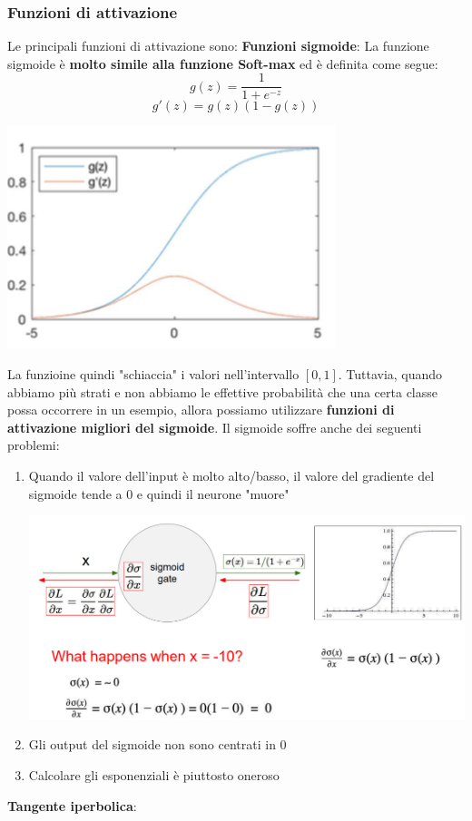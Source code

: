 \documentclass[12pt]{article}
\begin{document}
\subsubsection{Funzioni di attivazione}
Le principali funzioni di attivazione sono: \newline
\textbf{Funzioni sigmoide}: \newline 
La funzione sigmoide è \textbf{molto simile alla funzione Soft-max} ed è definita come segue:
$$g(z) = \frac{1}{1 + e^{-z}}$$
$$g'(z) = g(z)(1-g(z))$$
\begin{center}
    \includegraphics[width =0.40\linewidth]{Images/131.PNG}
\end{center}
La funzioine quindi "schiaccia" i valori nell'intervallo $[0,1]$. Tuttavia, quando abbiamo più strati e non abbiamo le effettive probabilità che una certa classe possa occorrere in un esempio, allora possiamo utilizzare \textbf{funzioni di attivazione migliori del sigmoide}. 
Il sigmoide soffre anche dei seguenti problemi:
\begin{enumerate}
    \item Quando il valore dell'input è molto alto/basso, il valore del gradiente del sigmoide tende a 0 e quindi il neurone "muore"
    \begin{center}
        \includegraphics[width =0.80\linewidth]{Images/134.PNG}
    \end{center}
    \item Gli output del sigmoide non sono centrati in 0
    \item Calcolare gli esponenziali è piuttosto oneroso
\end{enumerate}
\textbf{Tangente iperbolica}: \newline
\end{document}
